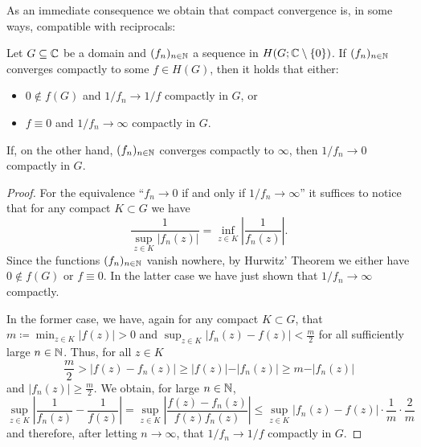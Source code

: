 As an immediate consequence we obtain that compact convergence is, in some ways, compatible with reciprocals:

\begin{lemma} \label{lem:compact-convergence-reciprocals}
Let $G \subseteq \mathbb{C}$ be a domain and $(f_n)_{n \in \mathbb{N}}$ a sequence in $H(G; \mathbb{C} \setminus \{ 0 \})$. If $(f_n)_{n \in \mathbb{N}}$ converges compactly to some $f \in H(G)$, then it holds that either:
\begin{itemize}
    \item $0 \notin f(G)$ and $1 / f_n \to 1 / f$ compactly in $G$, or
    \item $f \equiv 0$ and $1 / f_n \to \infty$ compactly in $G$.
\end{itemize}
If, on the other hand, $(f_n)_{n \in \mathbb{N}}$ converges compactly to $\infty$, then $1 / f_n \to 0$ compactly in $G$.
\end{lemma}

\begin{proof}
    For the equivalence ``$f_n \to 0$ if and only if $1 / f_n \to \infty$'' it suffices to notice that for any compact $K \subset G$ we have
    \begin{equation*}
        \frac{1}{\sup_{z \in K} \vert f_n(z) \vert} = \inf_{z \in K} \left\vert \frac{1}{f_n(z)} \right\vert.
    \end{equation*}
    Since the functions $(f_n)_{n \in \mathbb{N}}$ vanish nowhere, by Hurwitz' Theorem we either have $0 \notin f(G)$ or $f \equiv 0$. In the latter case we have just shown that $1 / f_n \to \infty$ compactly.

    In the former case, we have, again for any compact $K \subset G$, that $m \coloneqq \min_{z \in K} \vert f(z) \vert > 0$ and $\sup_{z \in K} \vert f_n(z) - f(z) \vert < \frac{m}{2}$ for all sufficiently large $n \in \mathbb{N}$. Thus, for all $z \in K$
    \begin{equation*}
        \frac{m}{2} > \vert f(z) - f_n(z) \vert \geq \vert f(z) \vert - \vert f_n(z) \vert \geq  m - \vert f_n(z) \vert
    \end{equation*}
    and $\vert f_n(z) \vert \geq \frac{m}{2}$. We obtain, for large $n \in \mathbb{N}$,
    \begin{equation*}
        \sup_{z \in K} \left\vert \frac{1}{f_n(z)} - \frac{1}{f(z)} \right\vert = \sup_{z \in K} \left\vert \frac{f(z) - f_n(z)}{f(z) f_n(z)} \right\vert \leq \sup_{z \in K} \left\vert f_n(z) - f(z) \right\vert \cdot \frac{1}{m} \cdot \frac{2}{m}
    \end{equation*}
    and therefore, after letting $n \to \infty$, that $1 / f_n \to 1 / f$ compactly in $G$.
\end{proof}

